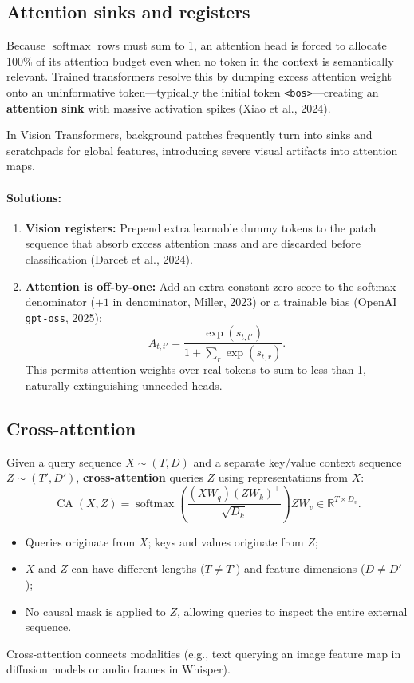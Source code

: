\documentclass[11pt,a4paper]{article}
\newcommand{\R}{\mathbb{R}}
\DeclareMathOperator{\softmax}{softmax}
\DeclareMathOperator{\CA}{CA}
\newcommand{\slides}[1]{\par\nopagebreak\noindent{\normalfont\small\emph{(slides #1)}}\par\nopagebreak\vspace{2pt}}
\theoremstyle{definition}
\theoremstyle{plain}
\begin{document}
\subsection{Attention sinks and registers}\slides{67 / 84}
Because $\softmax$ rows must sum to 1, an attention head is forced to allocate 100\% of its attention budget even when no token in the context is semantically relevant. Trained transformers resolve this by dumping excess attention weight onto an uninformative token—typically the initial token \texttt{<bos>}—creating an \textbf{attention sink} with massive activation spikes (Xiao et al., 2024).

In Vision Transformers, background patches frequently turn into sinks and scratchpads for global features, introducing severe visual artifacts into attention maps.

\paragraph{Solutions:}
\begin{enumerate}
\item \textbf{Vision registers:} Prepend extra learnable dummy tokens to the patch sequence that absorb excess attention mass and are discarded before classification (Darcet et al., 2024).
\item \textbf{Attention is off-by-one:} Add an extra constant zero score to the softmax denominator ($+1$ in denominator, Miller, 2023) or a trainable bias (OpenAI \texttt{gpt-oss}, 2025):
\begin{equation}
A_{t, t'} = \frac{\exp(s_{t, t'})}{1 + \sum_{r} \exp(s_{t, r})}.
\end{equation}
This permits attention weights over real tokens to sum to less than 1, naturally extinguishing unneeded heads.
\end{enumerate}

\subsection{Cross-attention}\slides{68 / 84}
Given a query sequence $X \sim (T, D)$ and a separate key/value context sequence $Z \sim (T', D')$, \textbf{cross-attention} queries $Z$ using representations from $X$:
\begin{equation}\label{eq:cross_attn_def}
\CA(X, Z) = \softmax\left( \frac{(X W_q)(Z W_k)^\top}{\sqrt{D_k}} \right) Z W_v \in \R^{T \times D_v}.
\end{equation}
\begin{itemize}[nosep]
\item Queries originate from $X$; keys and values originate from $Z$;
\item $X$ and $Z$ can have different lengths ($T \ne T'$) and feature dimensions ($D \ne D'$);
\item No causal mask is applied to $Z$, allowing queries to inspect the entire external sequence.
\end{itemize}
Cross-attention connects modalities (e.g., text querying an image feature map in diffusion models or audio frames in Whisper).
\end{document}
